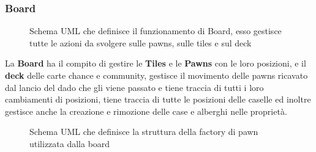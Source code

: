 \subsubsection{Board}
\begin{figure}[H]
    \centering
    \caption{Schema UML che definisce il funzionamento di Board, esso gestisce tutte le azioni da svolgere sulle pawns, sulle tiles e sul deck}
	\label{img:Board}
\end{figure}
La \textbf{Board} ha il compito di gestire le \textbf{Tiles} e le \textbf{Pawns} con le loro posizioni, e il \textbf{deck} delle carte chance e community, 
gestisce il movimento delle pawns ricavato dal lancio del dado che gli viene passato e tiene traccia di tutti i loro cambiamenti di posizioni,
tiene traccia di tutte le posizioni delle caselle ed inoltre gestisce anche la creazione e rimozione delle case e alberghi nelle proprietà.\newline
\begin{figure}[H]
    \centering
    \caption{Schema UML che definisce la struttura della factory di pawn utilizzata dalla board}
	\label{img:Pawns}
\end{figure}
